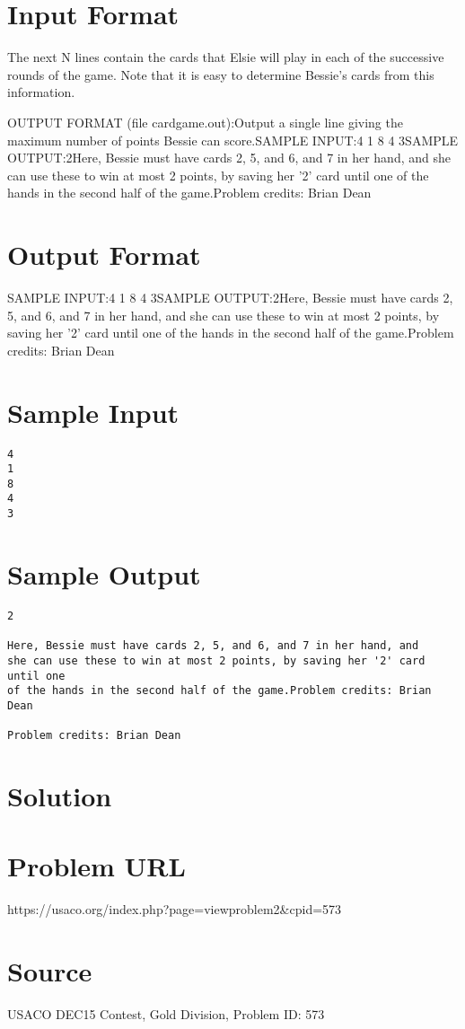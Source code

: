 \documentclass[12pt]{article}
\begin{document}
\section*{Input Format}
The next N lines contain the cards that Elsie will play in each of the
successive rounds of the game.  Note that it is easy to determine Bessie's cards
from this information.

OUTPUT FORMAT (file cardgame.out):Output a single line giving the maximum number of points Bessie can score.SAMPLE INPUT:4
1
8
4
3SAMPLE OUTPUT:2Here, Bessie must have cards 2, 5, and 6, and 7 in her hand, and
she can use these to win at most 2 points, by saving her '2' card until one
of the hands in the second half of the game.Problem credits: Brian Dean

\section*{Output Format}
SAMPLE INPUT:4
1
8
4
3SAMPLE OUTPUT:2Here, Bessie must have cards 2, 5, and 6, and 7 in her hand, and
she can use these to win at most 2 points, by saving her '2' card until one
of the hands in the second half of the game.Problem credits: Brian Dean

\section*{Sample Input}
\begin{verbatim}
4
1
8
4
3
\end{verbatim}

\section*{Sample Output}
\begin{verbatim}
2

Here, Bessie must have cards 2, 5, and 6, and 7 in her hand, and
she can use these to win at most 2 points, by saving her '2' card until one
of the hands in the second half of the game.Problem credits: Brian Dean

Problem credits: Brian Dean
\end{verbatim}

\section*{Solution}


\section*{Problem URL}
https://usaco.org/index.php?page=viewproblem2&cpid=573

\section*{Source}
USACO DEC15 Contest, Gold Division, Problem ID: 573
\end{document}
